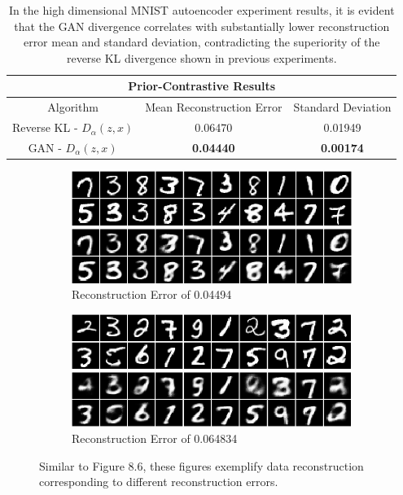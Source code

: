 \documentclass[honours,12pt, twoside]{unswthesis}
\numberwithin{equation}{section}
\theoremstyle{definition}
\begin{document}
\begin{table}[h]
\centering
\begin{tabular}{|c|c|c|}
\hline
\multicolumn{3}{|c|}{Prior-Contrastive Results}\\
\hline
Algorithm & Mean Reconstruction Error & Standard Deviation\\
\hline
Reverse KL - $D_\alpha(z,x)$ & 0.06470 & 0.01949\\
\hline
GAN - $D_\alpha(z,x)$ & \textbf{0.04440} & \textbf{0.00174}\\
\hline
\end{tabular}
\caption{\small In the high dimensional MNIST autoencoder experiment results, it is evident that the GAN divergence correlates with substantially lower reconstruction error mean and standard deviation, contradicting the superiority of the reverse KL divergence shown in previous experiments.}
\end{table}
\begin{figure}[h!]
\begin{subfigure}{\textwidth}
\centering
\includegraphics[width=0.9\linewidth]{044944.png}
\caption{Reconstruction Error of 0.04494}
\end{subfigure}
\begin{subfigure}{\textwidth}
\centering
\includegraphics[width=0.9\linewidth]{064834.png}
\caption{Reconstruction Error of 0.064834}
\end{subfigure}
\caption{\small Similar to Figure 8.6, these figures exemplify data reconstruction corresponding to different reconstruction errors.}
\end{figure}
\end{document}
